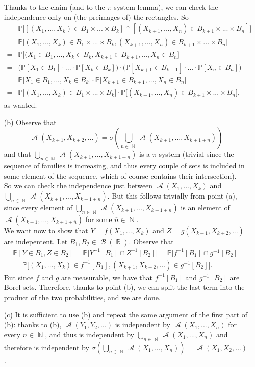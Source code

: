 \documentclass[12pt,a4paper]{report}
\theoremstyle{definition}
\theoremstyle{num.custom-title}
\DeclareMathOperator{\A}{\mathcal{A}}
\DeclareMathOperator{\B}{\mathcal{B}}
\DeclareMathOperator{\N}{\mathbb{N}}
\DeclareMathOperator{\R}{\mathbb{R}}
\renewcommand{\P}{\mathbb{P}}
\renewcommand{\1}{\mathbbm{1}}
\begin{document}
\begin{itemize}
Thanks to the claim (and to the $\pi$-system lemma), we can check the independence only on (the preimages of) the rectangles. So
\begin{align*}
&\P \big[ [(X_1,...,X_k) \in B_1 \times ... \times B_k] \cap [(X_{k+1},...,X_n) \in B_{k+1} \times ... \times B_n] \big]\\
=& \P \big[ (X_1,...,X_k) \in B_1 \times ... \times B_k, (X_{k+1},...,X_n) \in B_{k+1} \times ... \times B_n \big]\\
=& \P \big[ (X_1 \in B_1,...,X_k \in B_k, X_{k+1} \in B_{k+1},...,X_n \in B_n \big]\\
= & \big( \P[X_1 \in B_1] \cdot ... \cdot \P[X_k \in B_k] \big) \cdot \big( \P[X_{k+1} \in B_{k+1}] \cdot ... \cdot \P[X_n \in B_n] \big) \\
=& \P \big[ X_1 \in B_1,...,X_k \in B_k \big] \cdot \P \big[X_{k+1} \in B_{k+1},...,X_n \in B_n \big]\\
=& \P \big[ (X_1,...,X_k) \in B_1 \times ... \times B_k \big] \cdot \P \big[ (X_{k+1},...,X_n) \in B_{k+1} \times ... \times B_n \big],
\end{align*}
as wanted. 
\item[(b)] Observe that
\[
\A(X_{k+1},X_{k+2},...) = \sigma \left( \bigcup_{n \in \N} \A(X_{k+1},...,X_{k+1+n}) \right)
\]
and that $\bigcup_{n \in \N} \A(X_{k+1},...,X_{k+1+n})$ is a $\pi$-system (trivial since the sequence of families is increasing, and thus every couple of sets is included in some element of the sequence, which of course contains their intersection).\\
So we can check the independence just between $\A(X_1,...,X_{k})$ and $\bigcup_{n \in \N} \A(X_{k+1},..., X_{k+1+n})$. But this follows trivially from point (a), since every element of $\bigcup_{n \in \N} \A(X_{k+1},...,X_{k+1+n})$ is an element of $\A(X_{k+1},...,X_{k+1+\overline{n}})$ for some $\overline{n} \in \N$.\\
We want now to show that $Y=f(X_1,...,X_k)$ and $Z=g(X_{k+1},X_{k+2},...)$ are indepentent. Let $B_1, B_2 \in \B(\R)$. Observe that
\begin{multline*}
\P[Y \in B_1, Z \in B_2]= \P\big[Y^{-1}[B_1] \cap Z^{-1}[B_2]\big]= \P\big[f^{-1}[B_1] \cap g^{-1}[B_2]\big]\\ 
=\P\big[(X_1,...,X_k) \in f^{-1}[B_1], (X_{k+1},X_{k+2},...) \in g^{-1}[B_2]\big].
\end{multline*}
But since $f$ and $g$ are measurable, we have that $f^{-1}[B_1]$ and $g^{-1}[B_2]$ are Borel sets. Therefore, thanks to point (b), we can split the last term into the product of the two probabilities, and we are done.
\item[(c)] It is sufficient to use (b) and repeat the same argument of the first part of (b): thanks to (b), $\A(Y_1,Y_2,...)$ is independent by $\A(X_1,...,X_n)$ for every $n \in \N$, and thus is independent by $\bigcup_{n \in \N} \A(X_1,...,X_n)$ and therefore is independent by $\sigma \left( \bigcup_{n \in \N} \A(X_1,...,X_n) \right) = \A(X_1,X_2,...)$.
\end{itemize}
\end{document}
